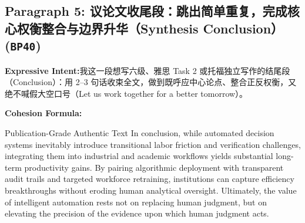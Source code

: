 \subsection*{Paragraph 5: 议论文收尾段：跳出简单重复，完成核心权衡整合与边界升华（Synthesis Conclusion） (\texttt{BP40})}
\noindent\textbf{Expressive Intent:}\enspace 我这一段想写六级、雅思 Task 2 或托福独立写作的结尾段（Conclusion）：用 2--3 句话收束全文，做到既呼应中心论点、整合正反权衡，又绝不喊假大空口号（Let us work together for a better tomorrow）。\par
\noindent\textbf{Cohesion Formula:}\par\vspace{4pt}
\begin{ExampleBox}{Publication-Grade Authentic Text}
In conclusion, while automated decision systems inevitably introduce transitional labor friction and verification challenges, integrating them into industrial and academic workflows yields substantial long-term productivity gains. By pairing algorithmic deployment with transparent audit trails and targeted workforce retraining, institutions can capture efficiency breakthroughs without eroding human analytical oversight. Ultimately, the value of intelligent automation rests not on replacing human judgment, but on elevating the precision of the evidence upon which human judgment acts.
\end{ExampleBox}
